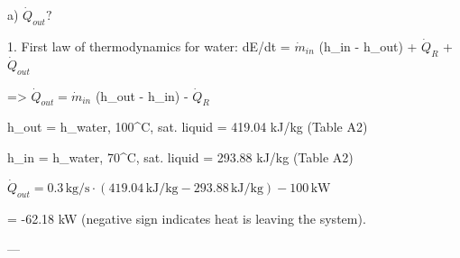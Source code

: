 a) \( \dot{Q}_{out}? \)  

1. First law of thermodynamics for water:  
dE/dt = \( \dot{m}_{in} \) (h_{in} - h_{out}) + \( \dot{Q}_R \) + \( \dot{Q}_{out} \)  

=> \( \dot{Q}_{out} = \dot{m}_{in} \) (h_{out} - h_{in}) - \( \dot{Q}_R \)  

h_{out} = h_{water, 100^\circ C, sat. liquid}  
= 419.04 kJ/kg (Table A2)  

h_{in} = h_{water, 70^\circ C, sat. liquid}  
= 293.88 kJ/kg (Table A2)  

\( \dot{Q}_{out} = 0.3 \, \text{kg/s} \cdot (419.04 \, \text{kJ/kg} - 293.88 \, \text{kJ/kg}) - 100 \, \text{kW} \)  

= -62.18 kW (negative sign indicates heat is leaving the system).  

---